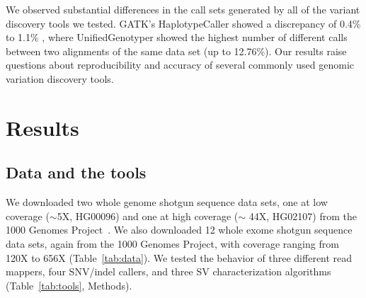 \documentclass[10pt,a4paper]{article}
\begin{document}
We observed substantial differences in the call sets generated by all of the variant discovery tools we tested. GATK's HaplotypeCaller showed a discrepancy of 0.4\% to 1.1\% , 
where UnifiedGenotyper showed the highest number of different calls between two alignments of the same data set (up to 12.76\%). 
Our results raise questions about reproducibility and accuracy of several commonly used genomic variation discovery tools. 




\section*{Results}

\subsection*{Data and the tools}
We downloaded two whole genome shotgun sequence data sets, one at low coverage ($\sim$5X, HG00096) and one at high coverage ($\sim$ 44X, HG02107) from the 1000 Genomes Project~\cite{1000GP2012}.
We also downloaded 12 whole exome shotgun sequence data sets, again from the 1000 Genomes Project, with coverage ranging from 120X to 656X (Table~\ref{tab:data}). We tested the behavior of 
three different read mappers, four SNV/indel callers, and three SV characterization algorithms (Table~\ref{tab:tools}, Methods).
\end{document}
